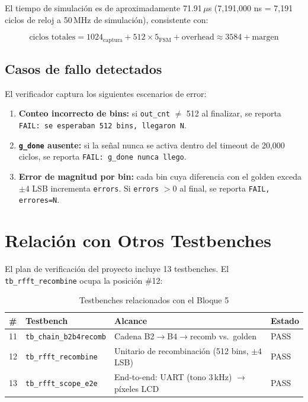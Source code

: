\documentclass[12pt, a4paper]{article}
\begin{document}
El tiempo de simulación es de aproximadamente 71.91\,$\mu$s (7,191,000 ns =
7,191 ciclos de reloj a 50\,MHz de simulación), consistente con:

\[
\text{ciclos totales} = 1024_{\text{captura}} + 512 \times 5_{\text{FSM}}
                      + \text{overhead} \approx 3584 + \text{margen}
\]

\subsection{Casos de fallo detectados}

El verificador captura los siguientes escenarios de error:

\begin{enumerate}[leftmargin=*]
    \item \textbf{Conteo incorrecto de bins:} si \texttt{out\_cnt} $\neq$ 512
          al finalizar, se reporta \texttt{FAIL: se esperaban 512 bins,
          llegaron N}.
    \item \textbf{\texttt{g\_done} ausente:} si la señal nunca se activa
          dentro del timeout de 20,000 ciclos, se reporta
          \texttt{FAIL: g\_done nunca llego}.
    \item \textbf{Error de magnitud por bin:} cada bin cuya diferencia con
          el golden exceda $\pm 4$ LSB incrementa \texttt{errors}. Si
          \texttt{errors} $> 0$ al final, se reporta
          \texttt{FAIL, errores=N}.
\end{enumerate}

\section{Relación con Otros Testbenches}

El plan de verificación del proyecto incluye 13 testbenches. El
\texttt{tb\_rfft\_recombine} ocupa la posición \#12:

\begin{table}[H]
\centering
\caption{Testbenches relacionados con el Bloque 5}
\begin{tabular}{p{1.2cm} p{4cm} p{4cm} p{3cm}}
\toprule
\textbf{\#} & \textbf{Testbench} & \textbf{Alcance} & \textbf{Estado} \\
\midrule
11 & \texttt{tb\_chain\_b2b4recomb} &
  Cadena B2$\rightarrow$B4$\rightarrow$recomb vs.\ golden &
  PASS \\
12 & \texttt{tb\_rfft\_recombine} &
  Unitario de recombinación (512 bins, $\pm 4$ LSB) &
  PASS \\
13 & \texttt{tb\_rfft\_scope\_e2e} &
  End-to-end: UART (tono 3\,kHz) $\rightarrow$ píxeles LCD &
  PASS \\
\bottomrule
\end{tabular}
\end{table}
\end{document}
